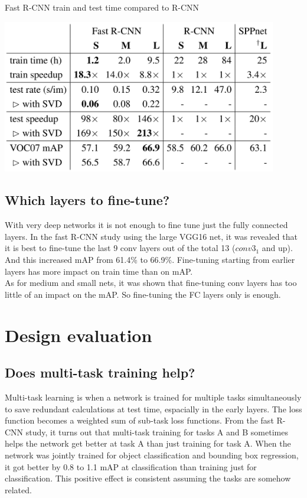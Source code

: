 \documentclass[10pt]{article}
\begin{document}
\begin{center}
\begin{table}
\caption{Fast R-CNN train and test time compared to R-CNN}
\includegraphics[width=0.9\textwidth]{20220602 1 speed.PNG}
\end{table}
\end{center}

\subsection{Which layers to fine-tune?}
With very deep networks it is not enough to fine tune just the fully connected layers. In the fast R-CNN study using the large VGG16 net, it was revealed that it is best to fine-tune the last 9 conv layers out of the total 13 ($conv3_1$ and up). And this increased mAP from 61.4\% to 66.9\%. Fine-tuning starting from earlier layers has more impact on train time than on mAP.\\
As for medium and small nets, it was shown that fine-tuning conv layers has too little of an impact on the mAP. So fine-tuning the FC layers only is enough.


\section{Design evaluation}

\subsection{Does multi-task training help?}
Multi-task learning is when a network is trained for multiple tasks simultaneously to save redundant calculations at test time, espacially in the early layers. The loss function becomes a weighted sum of sub-task loss functions. From the fast R-CNN study, it turns out that multi-task training for tasks A and B sometimes helps the network get better at task A than just training for task A. When the network was jointly trained for object classification and bounding box regression, it got better by 0.8 to 1.1 mAP at classification than training just for classification. This positive effect is consistent assuming the tasks are somehow related.
\end{document}
